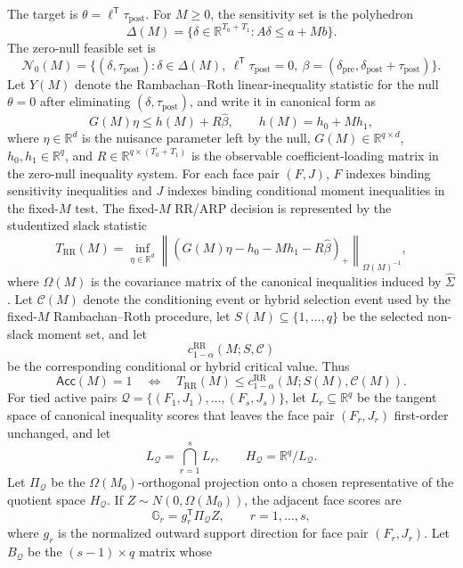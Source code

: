 \documentclass[11pt]{article}
\newcommand{\transpose}{\mathsf{T}}
\theoremstyle{definition}
\theoremstyle{plain}
\theoremstyle{remark}
\begin{document}
The target is \(\theta=\ell^\transpose\tau_{\mathrm{post}}\).  For
\(M\ge 0\), the sensitivity set is the polyhedron
\[
\Delta(M)=\{\delta\in\mathbb{R}^{T_0+T_1}: A\delta \le a+M b\}.
\]
The zero-null feasible set is
\[
\mathcal{N}_0(M)=\{(\delta,\tau_{\mathrm{post}}):
\delta\in\Delta(M),\ \ell^\transpose\tau_{\mathrm{post}}=0,\ 
\beta=(\delta_{\mathrm{pre}},
\delta_{\mathrm{post}}+\tau_{\mathrm{post}})\}.
\]
Let \(Y(M)\) denote the Rambachan--Roth linear-inequality statistic for the
null \(\theta=0\) after eliminating \((\delta,\tau_{\mathrm{post}})\), and
write it in canonical form as
\[
G(M)\eta \le h(M)+R\widehat\beta,\qquad
h(M)=h_0+M h_1,
\]
where \(\eta\in\mathbb{R}^d\) is the nuisance parameter left by the null,
\(G(M)\in\mathbb{R}^{q\times d}\), \(h_0,h_1\in\mathbb{R}^q\), and
\(R\in\mathbb{R}^{q\times(T_0+T_1)}\) is the observable coefficient-loading
matrix in the zero-null inequality system.  For each face pair \((F,J)\),
\(F\) indexes binding sensitivity inequalities and \(J\) indexes binding
conditional moment inequalities in the fixed-\(M\) test.
The fixed-\(M\) RR/ARP decision is represented by the studentized slack
statistic
\[
T_{\mathrm{RR}}(M)
=\inf_{\eta\in\mathbb{R}^d}
\left\| \left(G(M)\eta-h_0-Mh_1-R\widehat\beta\right)_{+}
\right\|_{\Omega(M)^{-1}},
\]
where \(\Omega(M)\) is the covariance matrix of the canonical inequalities
induced by \(\widehat\Sigma\).  Let \(\mathcal{C}(M)\) denote the conditioning
event or hybrid selection event used by the fixed-\(M\) Rambachan--Roth
procedure, let \(S(M)\subseteq\{1,\ldots,q\}\) be the selected non-slack
moment set, and let
\[
c_{1-\alpha}^{\mathrm{RR}}(M;S,\mathcal{C})
\]
be the corresponding conditional or hybrid critical value.  Thus
\[
\mathsf{Acc}(M)=1
\quad\Longleftrightarrow\quad
T_{\mathrm{RR}}(M)\le
c_{1-\alpha}^{\mathrm{RR}}(M;S(M),\mathcal{C}(M)).
\]
For tied active pairs
\(\mathcal{Q}=\{(F_1,J_1),\ldots,(F_s,J_s)\}\), let
\(L_r\subseteq\mathbb{R}^{q}\) be the tangent space of canonical inequality
scores that leaves the face pair \((F_r,J_r)\) first-order unchanged, and let
\[
L_{\mathcal{Q}}=\bigcap_{r=1}^s L_r,\qquad
H_{\mathcal{Q}}=\mathbb{R}^{q}/L_{\mathcal{Q}}.
\]
Let \(\Pi_{\mathcal{Q}}\) be the \(\Omega(M_0)\)-orthogonal projection onto a
chosen representative of the quotient space \(H_{\mathcal{Q}}\).  If
\(Z\sim N(0,\Omega(M_0))\), the adjacent face scores are
\[
\mathbb{G}_r=g_r^\transpose\Pi_{\mathcal{Q}}Z,\qquad r=1,\ldots,s,
\]
where \(g_r\) is the normalized outward support direction for face pair
\((F_r,J_r)\).  Let \(B_{\mathcal{Q}}\) be the \((s-1)\times q\) matrix whose
\end{document}
